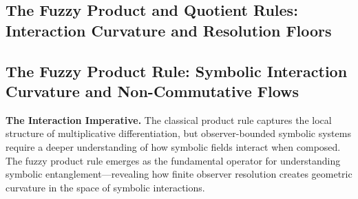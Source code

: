\subsection{The Fuzzy Product and Quotient Rules: Interaction Curvature and Resolution Floors}
\label{subsec:bk4_fuzzy_product_quotient}

\subsection{The Fuzzy Product Rule: Symbolic Interaction Curvature and Non-Commutative Flows}
\label{subsec:bk4_fuzzy_product_rule}

\textbf{The Interaction Imperative.} The classical product rule captures the local structure of multiplicative differentiation, but observer-bounded symbolic systems require a deeper understanding of how symbolic fields interact when composed. The fuzzy product rule emerges as the fundamental operator for understanding symbolic entanglement—revealing how finite observer resolution creates geometric curvature in the space of symbolic interactions.

